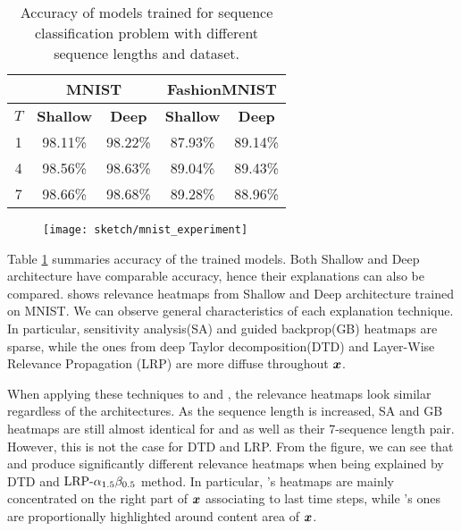 \renewcommand{\arraystretch}{1.5}
\begin{table}[]
\centering
\begin{tabular}{cc|c|c|c|}
\cline{2-5}
& \multicolumn{2}{|c|}{\textbf{MNIST}} & \multicolumn{2}{|c|}{\textbf{FashionMNIST}} \\ \hline
\multicolumn{1}{|c|}{$T$}   & \multicolumn{1}{c|}{\textbf{Shallow}} & \multicolumn{1}{c|}{\textbf{Deep}} & \multicolumn{1}{c|}{\textbf{Shallow}} & \multicolumn{1}{c|}{\textbf{Deep}} \\ \hline
\multicolumn{1}{|c|}{1} & 98.11\%   & 98.22\% & 87.93\%  & 89.14\%                           \\
\multicolumn{1}{|c|}{4} & 98.56\% & 98.63\%  & 89.04\%  & 89.43\%                            \\
\multicolumn{1}{|c|}{7} & 98.66\%  & 98.68\% & 89.28\%  & 88.96\%  \\ \hline
\end{tabular}
\caption{Accuracy of models trained for sequence classification problem with different sequence lengths and dataset. }
\label{tab:mnist_model_acc}
\end{table}
\renewcommand{\arraystretch}{1}



 \begin{figure}[!htb]
\centering
\texttt{[image: sketch/mnist\_experiment]}
\label{fig:mnist_experiment}
\end{figure}


Table \ref{tab:mnist_model_acc} summaries accuracy of the trained models. Both Shallow and Deep architecture have comparable accuracy, hence their explanations can also be compared. \addfigure{\ref{fig:mnist_experiment}} shows relevance heatmaps from Shallow and Deep architecture trained on MNIST.  We can observe general characteristics of each explanation technique. In particular, sensitivity analysis(SA) and guided backprop(GB) heatmaps are sparse, while the ones from deep Taylor decomposition(DTD) and Layer-Wise Relevance Propagation (LRP) are more diffuse throughout $\boldsymbol{x}$. 

 When applying these techniques to   and , the relevance heatmaps look similar regardless of the architectures.  As the sequence length is increased, SA and GB heatmaps are still almost identical  for  and  as well as their 7-sequence length pair. However, this is not the case for DTD and LRP.  From the figure, we can see that  and   produce significantly different relevance heatmaps when  being explained by DTD and $\text{LRP-}\alpha_{1.5}\beta_{0.5}$ method.  In particular,   's heatmaps are mainly concentrated on the right part of $\boldsymbol{x}$ associating to last time steps, while  's ones are proportionally  highlighted around content area of $\boldsymbol{x}$.


